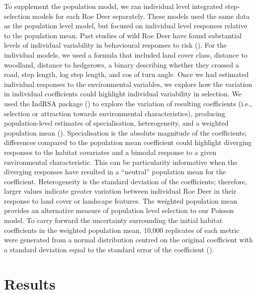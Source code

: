 \documentclass[10pt,a4paper]{article}
\begin{document}
To supplement the population model, we ran individual level integrated step-selection models for each Roe Deer separately.
These models used the same data as the population level model, but focused on individual level responses relative to the population mean.
Past studies of wild Roe Deer have found substantial levels of individual variability in behavioural responses to risk ().
For the individual models, we used a formula that included land cover class, distance to woodland, distance to hedgerows, a binary describing whether they crossed a road, step length, log step length, and cos of turn angle.
Once we had estimated individual responses to the environmental variables, we explore how the variation in individual coefficients could highlight individual variability in selection.
We used the IndRSA package () to explore the variation of resulting coefficients (i.e., selection or attraction towards environmental characteristics), producing population-level estimates of specialisation, heterogeneity, and a weighted population mean ().
Specialisation is the absolute magnitude of the coefficients; differences compared to the population mean coefficient could highlight diverging responses to the habitat covariates and a bimodal response to a given environmental characteristic.
This can be particularity informative when the diverging responses have resulted in a ``neutral'' population mean for the coefficient.
Heterogeneity is the standard deviation of the coefficients; therefore, larger values indicate greater variation between individual Roe Deer in their response to land cover or landscape features.
The weighted population mean provides an alternative measure of population level selection to our Poisson model.
To carry forward the uncertainty surrounding the initial habitat coefficients in the weighted population mean, 10,000 replicates of each metric were generated from a normal distribution centred on the original coefficient with a standard deviation equal to the standard error of the coefficient ().

\clearpage

\section{Results}\label{results}
\end{document}
